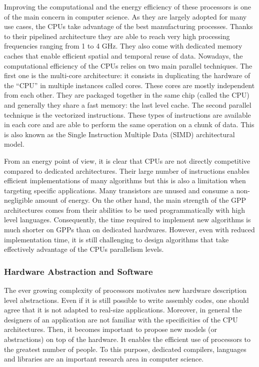 Improving the computational and the energy efficiency of these processors is one
of the main concern in computer science. As they are largely adopted for many
use cases, the CPUs take advantage of the best manufacturing processes. Thanks
to their pipelined architecture they are able to reach very high processing
frequencies ranging from 1 to 4 GHz. They also come with dedicated memory caches
that enable efficient spatial and temporal reuse of data. Nowadays, the
computational efficiency of the CPUs relies on two main parallel techniques. The
first one is the multi-core architecture: it consists in duplicating the
hardware of the ``CPU'' in multiple instances called cores. These cores are
mostly independent from each other. They are packaged together in the same chip
(called the CPU) and generally they share a fast memory: the last level cache.
The second parallel technique is the vectorized instructions. These types of
instructions are available in each core and are able to perform the same
operation on a chunk of data. This is also known as the Single Instruction
Multiple Data (SIMD) architectural model.

From an energy point of view, it is clear that CPUs are not directly competitive
compared to dedicated architectures. Their large number of instructions enables
efficient implementations of many algorithms but this is also a limitation when
targeting specific applications. Many transistors are unused and consume a
non-negligible amount of energy. On the other hand, the main strength of the GPP
architectures comes from their abilities to be used programmatically with high
level languages. Consequently, the time required to implement new algorithms is
much shorter on GPPs than on dedicated hardwares. However, even with reduced
implementation time, it is still challenging to design algorithms that take
effectively advantage of the CPUs parallelism levels.

\subsubsection*{Hardware Abstraction and Software}

The ever growing complexity of processors motivates new hardware description
level abstractions. Even if it is still possible to write assembly codes, one
should agree that it is not adapted to real-size applications. Moreover, in
general the designers of an application are not familiar with the specificities
of the CPU architectures. Then, it becomes important to propose new models (or
abstractions) on top of the hardware. It enables the efficient use of processors
to the greatest number of people. To this purpose, dedicated compilers,
languages and libraries are an important research area in computer science.

